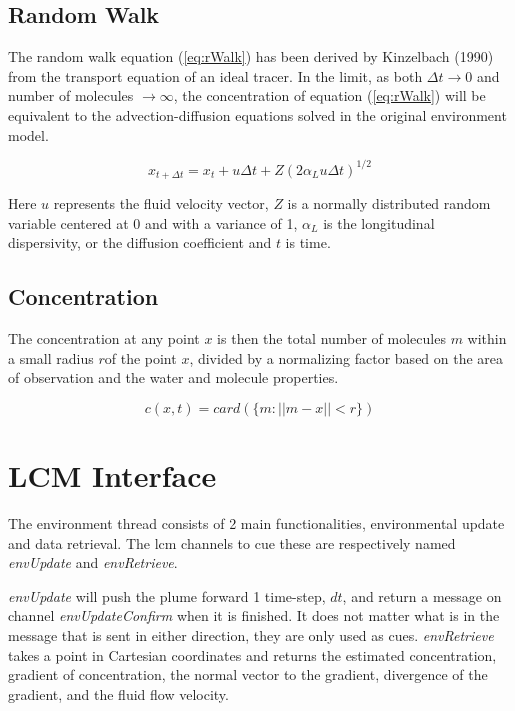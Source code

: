 \documentclass[11pt]{article} %
\begin{document}
\subsection{Random Walk}
The random walk equation (\ref{eq:rWalk}) has been derived by Kinzelbach (1990) from the transport equation of an ideal tracer.  In the limit, as both $\Delta t \rightarrow 0$ and number of molecules $\rightarrow \infty$, the concentration of equation (\ref{eq:rWalk}) will be equivalent to the advection-diffusion equations solved in the original environment model.

\begin{equation} \label{eq:rWalk}
x_{t+\Delta t} = x_{t} + u\Delta t + Z(2 \alpha_L u\Delta t)^{1/2}
\end{equation}

Here $u$ represents the fluid velocity vector,  $Z$ is a normally distributed random variable centered at 0 and with a variance of 1, $\alpha_L$ is the longitudinal dispersivity, or the diffusion coefficient and $t$ is time.  


\subsection{Concentration}

The concentration at any point $x$ is then the total number of molecules $m$ within a small radius $r$of the point $x$, divided by a normalizing factor based on the area of observation and the water and molecule properties.  

$$
c(x,t) = card( \{  m : ||m-x|| < r \} )
$$

\section{LCM Interface}
The environment thread consists of 2 main functionalities, environmental update and data retrieval. The lcm channels to cue these are respectively named {\it envUpdate} and {\it envRetrieve}.

{\it envUpdate} will push the plume forward 1 time-step, $dt$, and return a message on channel {\it envUpdateConfirm} when it is finished.  It does not matter what is in the message that is sent in either direction, they are only used as cues. {\it envRetrieve} takes a point in Cartesian coordinates and returns the estimated concentration, gradient of concentration, the normal vector to the gradient, divergence of the gradient, and the fluid flow velocity. \\
\end{document}
